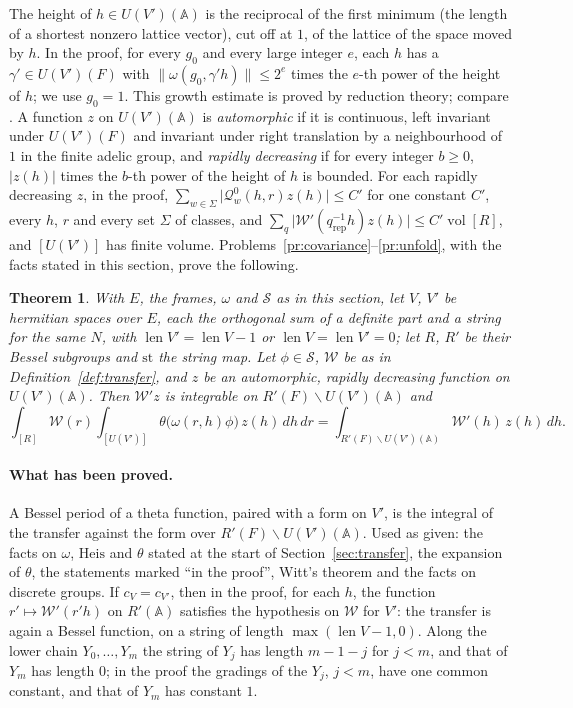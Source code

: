 \documentclass[reqno]{amsart}
\theoremstyle{definition}
\theoremstyle{plain}
\newtheorem{theorem}{Theorem}[section]
\theoremstyle{remark}
\newcommand{\A}{\mathbb{A}}
\newcommand{\Wc}{\mathcal{W}}
\newcommand{\Sc}{\mathcal{S}}
\newcommand{\st}{\mathrm{st}}
\newcommand{\Heis}{\mathrm{Heis}}
\newcommand{\len}{\operatorname{len}}
\newcommand{\rep}{\mathrm{rep}}
\begin{document}
The height of \(h\in U(V')(\A)\) is the reciprocal of the first minimum (the length of a shortest nonzero lattice vector), cut off at \(1\), of the lattice of the space moved by \(h\).  In the proof, for every \(g_0\) and every large integer \(e\), each \(h\) has a \(\gamma'\in U(V')(F)\) with \(\lVert\omega(g_0,\gamma'h)\rVert\le2^e\) times the \(e\)-th power of the height of \(h\); we use \(g_0=1\).  This growth estimate is proved by reduction theory; compare \cite{KR}.  A function \(z\) on \(U(V')(\A)\) is \emph{automorphic} if it is continuous, left invariant under \(U(V')(F)\) and invariant under right translation by a neighbourhood of \(1\) in the finite adelic group, and \emph{rapidly decreasing} if for every integer \(b\ge0\), \(\lvert z(h)\rvert\) times the \(b\)-th power of the height of \(h\) is bounded.  For each rapidly decreasing \(z\), in the proof, \(\sum_{w\in\Sigma}\lvert\mathcal Q^0_w(h,r)z(h)\rvert\le C'\) for one constant \(C'\), every \(h\), \(r\) and every set \(\Sigma\) of classes, and \(\sum_q\lvert\Wc'(q_\rep^{-1}h)z(h)\rvert\le C'\operatorname{vol}[R]\), and \([U(V')]\) has finite volume.  Problems~\ref{pr:covariance}--\ref{pr:unfold}, with the facts stated in this section, prove the following.

\begin{theorem}\label{thm:transfer}
With \(E\), the frames, \(\omega\) and \(\Sc\) as in this section, let \(V\), \(V'\) be hermitian spaces over \(E\), each the orthogonal sum of a definite part and a string for the same \(N\), with \(\len V'=\len V-1\) or \(\len V=\len V'=0\); let \(R\), \(R'\) be their Bessel subgroups and \(\st\) the string map.  Let \(\phi\in\Sc\), \(\Wc\) be as in Definition~\ref{def:transfer}, and \(z\) be an automorphic, rapidly decreasing function on \(U(V')(\A)\).  Then \(\Wc'z\) is integrable on \(R'(F)\backslash U(V')(\A)\) and
\[
  \int_{[R]}\Wc(r)\int_{[U(V')]}\theta\bigl(\omega(r,h)\phi\bigr)\,z(h)\,dh\,dr=\int_{R'(F)\backslash U(V')(\A)}\Wc'(h)\,z(h)\,dh .
\]
\end{theorem}

\paragraph{What has been proved.}  A Bessel period of a theta function, paired with a form on \(V'\), is the integral of the transfer against the form over \(R'(F)\backslash U(V')(\A)\).  Used as given: the facts on \(\omega\), \(\Heis\) and \(\theta\) stated at the start of Section~\ref{sec:transfer}, the expansion of \(\theta\), the statements marked ``in the proof'', Witt's theorem and the facts on discrete groups.  If \(c_V=c_{V'}\), then in the proof, for each \(h\), the function \(r'\mapsto\Wc'(r'h)\) on \(R'(\A)\) satisfies the hypothesis on \(\Wc\) for \(V'\): the transfer is again a Bessel function, on a string of length \(\max(\len V-1,0)\).  Along the lower chain \(Y_0,\dots,Y_m\) the string of \(Y_j\) has length \(m-1-j\) for \(j<m\), and that of \(Y_m\) has length \(0\); in the proof the gradings of the \(Y_j\), \(j<m\), have one common constant, and that of \(Y_m\) has constant \(1\).
\end{document}
